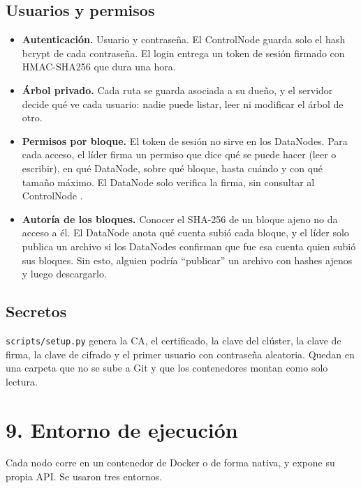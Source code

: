 \documentclass[10pt]{article}
\begin{document}
\subsection{Usuarios y permisos}

\begin{itemize}
\item \textbf{Autenticación.} Usuario y contraseña. El ControlNode guarda solo el hash bcrypt de cada contraseña. El login entrega un token de sesión firmado con HMAC-SHA256 que dura una hora.
\item \textbf{Árbol privado.} Cada ruta se guarda asociada a su dueño, y el servidor decide qué ve cada usuario: nadie puede listar, leer ni modificar el árbol de otro.
\item \textbf{Permisos por bloque.} El token de sesión no sirve en los DataNodes. Para cada acceso, el líder firma un permiso que dice qué se puede hacer (leer o escribir), en qué DataNode, sobre qué bloque, hasta cuándo y con qué tamaño máximo. El DataNode solo verifica la firma, sin consultar al ControlNode .
\item \textbf{Autoría de los bloques.} Conocer el SHA-256 de un bloque ajeno no da acceso a él. El DataNode anota qué cuenta subió cada bloque, y el líder solo publica un archivo si los DataNodes confirman que fue esa cuenta quien subió sus bloques. Sin esto, alguien podría ``publicar'' un archivo con hashes ajenos y luego descargarlo.
\end{itemize}

\subsection{Secretos}

\texttt{scripts/setup.py} genera la CA, el certificado, la clave del clúster, la clave de firma, la clave de cifrado y el primer usuario con contraseña aleatoria. Quedan en una carpeta que no se sube a Git y que los contenedores montan como solo lectura.

\separador

\section{9. Entorno de ejecución}

Cada nodo corre en un contenedor de Docker o de forma nativa, y expone su propia API. Se usaron tres entornos.
\end{document}
